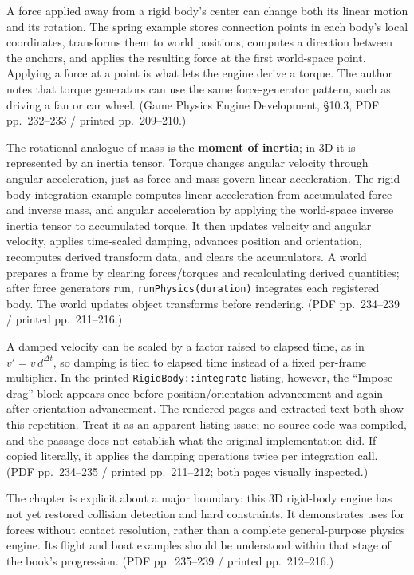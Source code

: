 A force applied away from a rigid body's center can change both its linear motion and its rotation. The spring example stores connection points in each body's local coordinates, transforms them to world positions, computes a direction between the anchors, and applies the resulting force at the first world-space point. Applying a force at a point is what lets the engine derive a torque. The author notes that torque generators can use the same force-generator pattern, such as driving a fan or car wheel. (Game Physics Engine Development, §10.3, PDF pp.~232--233 / printed pp.~209--210.)

The rotational analogue of mass is the \textbf{moment of inertia}; in 3D it is represented by an inertia tensor. Torque changes angular velocity through angular acceleration, just as force and mass govern linear acceleration. The rigid-body integration example computes linear acceleration from accumulated force and inverse mass, and angular acceleration by applying the world-space inverse inertia tensor to accumulated torque. It then updates velocity and angular velocity, applies time-scaled damping, advances position and orientation, recomputes derived transform data, and clears the accumulators. A world prepares a frame by clearing forces/torques and recalculating derived quantities; after force generators run, \texttt{runPhysics(duration)} integrates each registered body. The world updates object transforms before rendering. (PDF pp.~234--239 / printed pp.~211--216.)

A damped velocity can be scaled by a factor raised to elapsed time, as in \(v' = v\,d^{\Delta t}\), so damping is tied to elapsed time instead of a fixed per-frame multiplier. In the printed \texttt{RigidBody::integrate} listing, however, the ``Impose drag'' block appears once before position/orientation advancement and again after orientation advancement. The rendered pages and extracted text both show this repetition. Treat it as an apparent listing issue; no source code was compiled, and the passage does not establish what the original implementation did. If copied literally, it applies the damping operations twice per integration call. (PDF pp.~234--235 / printed pp.~211--212; both pages visually inspected.)

The chapter is explicit about a major boundary: this 3D rigid-body engine has not yet restored collision detection and hard constraints. It demonstrates uses for forces without contact resolution, rather than a complete general-purpose physics engine. Its flight and boat examples should be understood within that stage of the book's progression. (PDF pp.~235--239 / printed pp.~212--216.)

